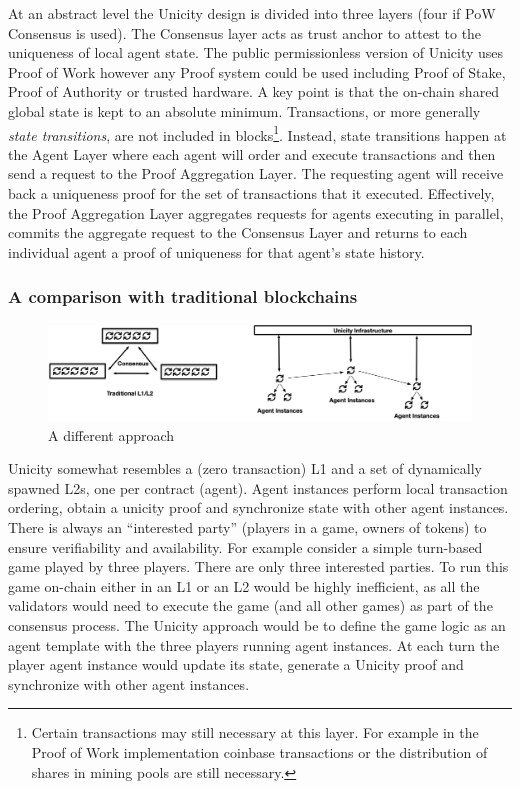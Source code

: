 \documentclass{article}
\begin{document}
At an abstract level the Unicity design is divided into three layers (four if PoW Consensus is used). The Consensus layer acts as trust anchor to attest to the uniqueness of local agent state. The public permissionless version of Unicity uses Proof of Work however any Proof system could be used including Proof of Stake, Proof of Authority or trusted hardware. A key point is that the on-chain shared global state is kept to an absolute minimum. Transactions, or more generally \textit{state transitions}, are not included in blocks\footnote{Certain transactions may still necessary at this layer. For example in the Proof of Work implementation coinbase transactions or the distribution of shares in mining pools are still necessary.}.
	Instead, state transitions happen at the Agent Layer where each agent will order and execute transactions and then send a request to the Proof Aggregation Layer. The requesting agent will receive back a uniqueness proof for the set of transactions that it executed. Effectively, the Proof Aggregation Layer aggregates requests for agents executing in parallel,  commits the aggregate request to the Consensus Layer and returns to each individual agent a proof of uniqueness for that agent's state history.



\subsubsection{A comparison with traditional blockchains}

\begin{figure}[htbp]
    \centering
    \includegraphics[width=\textwidth]{Comparison.png}
    \caption{A different approach}
    \label{fig:comp}
\end{figure}

Unicity somewhat resembles a (zero transaction) L1 and a set of dynamically spawned L2s, one per contract (agent). Agent instances perform local transaction ordering, obtain a unicity proof and synchronize state with other agent instances. There is always an ``interested party'' (players in a game, owners of tokens) to ensure verifiability and availability. For example consider a simple turn-based game played by three players. There are only three interested parties. To run this game on-chain either in an L1 or an L2 would be highly inefficient, as all the validators would need to execute the game (and all other games) as part of the consensus process. The Unicity approach would be to define the game logic as an agent template with the three players running agent instances. At each turn the player agent instance would update its state, generate a Unicity proof and synchronize with other agent instances.
\end{document}
